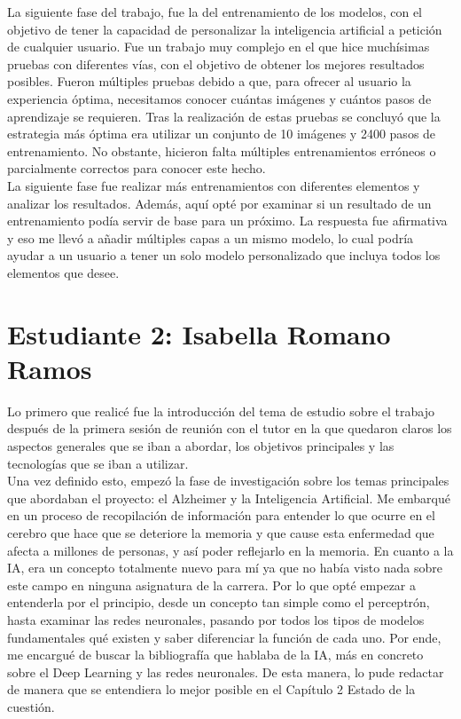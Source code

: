 La siguiente fase del trabajo, fue la del entrenamiento de los modelos, con el objetivo de tener la capacidad de personalizar la inteligencia artificial a petición de cualquier usuario. Fue un trabajo muy complejo en el que hice muchísimas pruebas con diferentes vías, con el objetivo de obtener los mejores resultados posibles. Fueron múltiples pruebas debido a que, para ofrecer al usuario la experiencia óptima, necesitamos conocer cuántas imágenes y cuántos pasos de aprendizaje se requieren. Tras la realización de estas pruebas se concluyó que la estrategia más óptima era utilizar un conjunto de 10 imágenes y 2400 pasos de entrenamiento. No obstante, hicieron falta múltiples entrenamientos erróneos o parcialmente correctos para conocer este hecho.\\
 
La siguiente fase fue realizar más entrenamientos con diferentes elementos y analizar los resultados. Además, aquí opté por examinar si un resultado de un entrenamiento podía servir de base para un próximo. La respuesta fue afirmativa y eso me llevó a añadir múltiples capas a un mismo modelo, lo cual podría ayudar a un usuario a tener un solo modelo personalizado que incluya todos los elementos que desee. 


\section*{Estudiante 2: Isabella Romano Ramos}
Lo primero que realicé fue la introducción del tema de estudio sobre el trabajo después de la primera sesión de reunión con el tutor en la que quedaron claros los aspectos generales que se iban a abordar, los objetivos principales y las tecnologías que se iban a utilizar. \\

Una vez definido esto, empezó la fase de investigación sobre los temas principales que abordaban el proyecto: el Alzheimer y la Inteligencia Artificial. Me embarqué en un proceso de recopilación de información para entender lo que ocurre en el cerebro que hace que se deteriore la memoria y que cause esta enfermedad que afecta a millones de personas, y así poder reflejarlo en la memoria. En cuanto a la IA, era un concepto totalmente nuevo para mí ya que no había visto nada sobre este campo en ninguna asignatura de la carrera. Por lo que opté empezar a entenderla por el principio, desde un concepto tan simple como el perceptrón, hasta examinar las redes neuronales, pasando por todos los tipos de modelos fundamentales qué existen y saber diferenciar la función de cada uno. Por ende, me encargué de buscar la bibliografía que hablaba de la IA, más en concreto sobre el Deep Learning y las redes neuronales. De esta manera, lo pude redactar de manera que se entendiera lo mejor posible en el Capítulo 2 Estado de la cuestión. \\

